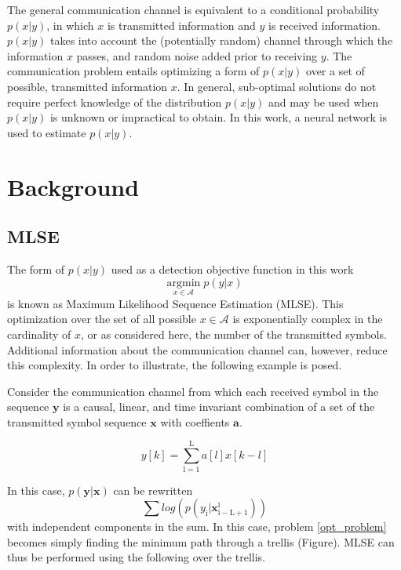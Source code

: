 \documentclass[12pt,a4paper]{report}
\begin{document}
The general communication channel is equivalent to a conditional probability $p(x|y)$, in which $x$ is transmitted information and $y$ is received information.  $p(x|y)$ takes into account the (potentially random) channel through which the information $x$ passes, and random noise added prior to receiving $y$. The communication problem entails optimizing a form of $p(x|y)$ over a set of possible, transmitted information $x$. In general, sub-optimal solutions do not require perfect knowledge of the distribution $p(x|y)$ and may be used when $p(x|y)$ is unknown or impractical to obtain. In this work, a neural network is used to estimate $p(x|y)$.

\section{Background}

\subsection{MLSE}
The form of $p(x|y)$ used as a detection objective function in this work 
\begin{equation}\label{opt_problem}
\underset{x \in \textit{$\mathcal{A}$}}{\text{argmin}} \; p(y|x)
\end{equation}
is known as Maximum Likelihood Sequence Estimation (MLSE).
This optimization over the set of all possible $x \in \mathcal{A}$ is exponentially complex in the cardinality of $x$, or as considered here, the number of the transmitted symbols. Additional information about the communication channel can, however, reduce this complexity. In order to illustrate, the following example is posed.
\par
Consider the communication channel from which each received symbol in the sequence $\mathbf{y}$ is a causal, linear, and time invariant combination of a set of the transmitted symbol sequence $\mathbf{x}$ with coeffients $\mathbf{a}$. 

\begin{equation}
y[k] = \sum_{\mathrm{l=1}}^{\mathrm{L}} a[l]x[k-l]
\end{equation}

In this case, $p(\mathbf{y}|\mathbf{x})$ can be rewritten 
\begin{equation}
\sum log(p(y_{\mathrm{i}}|\mathbf{x}_{\mathrm{i-L+1}}^{\mathrm{i}}) )
\end{equation}
with independent components in the sum. In this case, problem \eqref{opt_problem} becomes simply finding the minimum path through a trellis (Figure).
MLSE can thus be performed using the following over the trellis. 
\\
\end{document}
